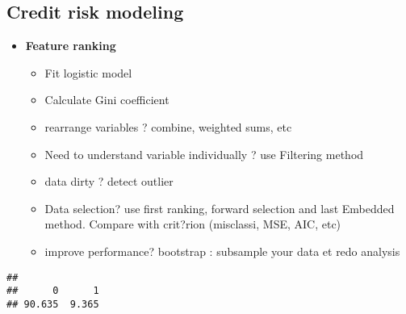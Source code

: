\documentclass[]{book}
\newenvironment{Shaded}{\begin{snugshade}}{\end{snugshade}}
\newcommand{\KeywordTok}[1]{\textcolor[rgb]{0.13,0.29,0.53}{\textbf{#1}}}
\newcommand{\DecValTok}[1]{\textcolor[rgb]{0.00,0.00,0.81}{#1}}
\newcommand{\StringTok}[1]{\textcolor[rgb]{0.31,0.60,0.02}{#1}}
\newcommand{\CommentTok}[1]{\textcolor[rgb]{0.56,0.35,0.01}{\textit{#1}}}
\newcommand{\OperatorTok}[1]{\textcolor[rgb]{0.81,0.36,0.00}{\textbf{#1}}}
\newcommand{\AlertTok}[1]{\textcolor[rgb]{0.94,0.16,0.16}{#1}}
\newcommand{\NormalTok}[1]{#1}
\providecommand{\tightlist}{%
  \setlength{\itemsep}{0pt}\setlength{\parskip}{0pt}}
\theoremstyle{definition}
\theoremstyle{definition}
\theoremstyle{definition}
\theoremstyle{remark}
\begin{document}
\subsection{Credit risk modeling}\label{credit-risk-modeling}

\begin{itemize}
\tightlist
\item
  \textbf{Feature ranking}

  \begin{itemize}
  \tightlist
  \item
    Fit logistic model
  \item
    Calculate Gini coefficient
  \item
    rearrange variables ? combine, weighted sums, etc
  \item
    Need to understand variable individually ? use Filtering method
  \item
    data dirty ? detect outlier
  \item
    Data selection? use first ranking, forward selection and last
    Embedded method. Compare with crit?rion (misclassi, MSE, AIC, etc)
  \item
    improve performance? bootstrap : subsample your data et redo
    analysis
  \end{itemize}
\end{itemize}

\begin{Shaded}
\end{Shaded}

\begin{verbatim}
## 
##      0      1 
## 90.635  9.365
\end{verbatim}
\end{document}
